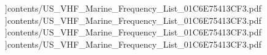 \documentclass{article}
\begin{document}
]{contents/US_VHF_Marine_Frequency_List_01C6E75413CF3.pdf}
]{contents/US_VHF_Marine_Frequency_List_01C6E75413CF3.pdf}
]{contents/US_VHF_Marine_Frequency_List_01C6E75413CF3.pdf}
]{contents/US_VHF_Marine_Frequency_List_01C6E75413CF3.pdf}
\end{document}
